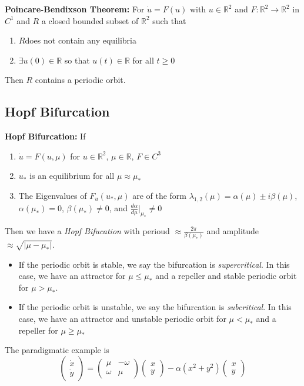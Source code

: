 \documentclass[12pt]{article}
\newcommand{\R}{\mathbb{R}}
\newcommand{\abs}[1]{\left\vert #1 \right\vert}
\newcommand*{\tbf}[1]{\ifmmode\mathbf{#1}\else\textbf{#1}\fi}
\newenvironment*{proposition}[1][gray]{
    \begin{tcolorbox}[
        parbox=false,
        colback=#1!5!white,
        colframe=#1!75!black,
        breakable
    ]}
    {\end{tcolorbox}}
\begin{document}
\begin{multicols}{2}
    \begin{proposition}
        \textbf{Poincare-Bendixson Theorem:} For $\dot u = F(u)$ with $u \in \R^2$ and $F: \R^2 \to \R^2$ in $C^1$ and $R$ a closed bounded subset of $\R^2$ such that
        \begin{enumerate}
            \item $R$does not contain any equilibria
            \item $\exists u(0) \in \R$ so that $u(t) \in \R$ for all $t \geq 0$
        \end{enumerate}
        Then $R$ contains a periodic orbit.
    \end{proposition}

    \subsection*{Hopf Bifurcation}
    \tbf{Hopf Bifurcation:} If
    \begin{enumerate}
        \item $\dot u = F(u, \mu)$ for $u \in \R^2$, $\mu \in \R$, $F \in C^3$
        \item $u_*$ is an equilibrium for all $\mu \approx \mu_*$
        \item The Eigenvalues of $F_u(u_*, \mu)$ are of the form $\lambda_{1,2}(\mu) = \alpha(\mu) \pm i\beta(\mu)$, $\alpha(\mu_*) = 0$, $\beta(\mu_*) \neq 0$, and $\frac{d\alpha}{d\mu}\bigg\vert_{\mu_*} \neq 0$
    \end{enumerate}

    Then we have a \emph{Hopf Bifucation} with perioud $\approx \frac{2\pi}{\beta(\mu_*)}$ and amplitude $\approx \sqrt{\abs{\mu - \mu_*}}$.
    \begin{itemize}
        \item If the periodic orbit is stable, we say the bifurcation is \emph{supercritical}. In this case, we have an attractor for $\mu \leq \mu_*$ and a repeller and stable periodic orbit for $\mu > \mu_*$.
        \item If the periodic orbit is unstable, we say the bifurcation is \emph{subcritical}. In this case, we have an attractor and unstable periodic orbit for $\mu < \mu_*$ and a repeller for $\mu \geq \mu_*$
    \end{itemize}

    The paradigmatic example is
    \[\begin{pmatrix}
            \dot x \\ \dot y
        \end{pmatrix} = \begin{pmatrix}
            \mu    & -\omega \\
            \omega & \mu
        \end{pmatrix} \begin{pmatrix}
            x \\y
        \end{pmatrix} -\alpha(x^2 + y^2)\begin{pmatrix}
            x \\y
        \end{pmatrix}\]


\end{multicols}
\end{document}
